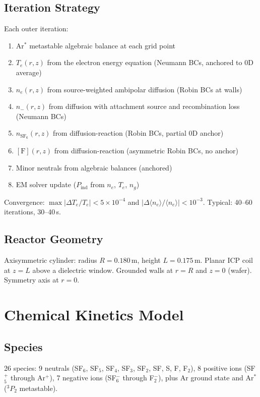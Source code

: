 \documentclass[11pt,a4paper]{article}
\renewcommand{\ne}{n_e}
\newcommand{\Te}{T_e}
\newcommand{\SFsix}{\mathrm{SF}_6}
\begin{document}
\subsection{Iteration Strategy}

Each outer iteration:
\begin{enumerate}[nosep]
\item Ar$^*$ metastable algebraic balance at each grid point
\item $\Te(r,z)$ from the electron energy equation (Neumann BCs, anchored to 0D average)
\item $\ne(r,z)$ from source-weighted ambipolar diffusion (Robin BCs at walls)
\item $n_-(r,z)$ from diffusion with attachment source and recombination loss (Neumann BCs)
\item $n_{\SFsix}(r,z)$ from diffusion-reaction (Robin BCs, partial 0D anchor)
\item $[\mathrm{F}](r,z)$ from diffusion-reaction (asymmetric Robin BCs, no anchor)
\item Minor neutrals from algebraic balances (anchored)
\item EM solver update ($P_{\mathrm{ind}}$ from $\ne$, $\Te$, $n_g$)
\end{enumerate}

Convergence: $\max|\Delta\Te/\Te| < 5\times10^{-4}$ and $|\Delta\langle\ne\rangle/\langle\ne\rangle| < 10^{-3}$.  Typical: 40--60 iterations, 30--40\,s.

\subsection{Reactor Geometry}

Axisymmetric cylinder: radius $R = 0.180$\,m, height $L = 0.175$\,m.  Planar ICP coil at $z = L$ above a dielectric window.  Grounded walls at $r = R$ and $z = 0$ (wafer).  Symmetry axis at $r = 0$.

\section{Chemical Kinetics Model}
\label{sec:chem}

\subsection{Species}

26 species: 9 neutrals (SF$_6$, SF$_5$, SF$_4$, SF$_3$, SF$_2$, SF, S, F, F$_2$), 8 positive ions (SF$_5^+$ through Ar$^+$), 7 negative ions (SF$_6^-$ through F$_2^-$), plus Ar ground state and Ar$^*$ ($^3P_2$ metastable).
\end{document}
